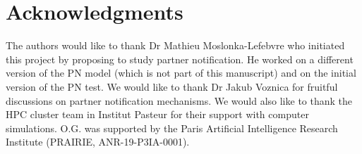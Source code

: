 \documentclass[10pt,letterpaper]{article}
\begin{document}
\section*{Acknowledgments}
The authors would like to thank Dr Mathieu Moslonka-Lefebvre who initiated this project by proposing to study partner notification. He worked on a different version of the PN model (which is not part of this manuscript) and on the initial version of the PN test. We would like to thank Dr Jakub Voznica for fruitful discussions on partner notification mechanisms.
We would also like to thank the HPC cluster team in Institut Pasteur for their support with computer simulations. O.G. was supported by the Paris Artificial Intelligence Research Institute (PRAIRIE, ANR-19-P3IA-0001).

\nolinenumbers



%
%
% 
%
%
%
%
\end{document}
